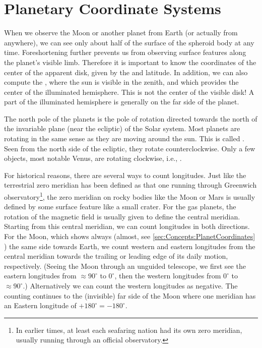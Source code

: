 \section{Planetary Coordinate Systems}
\label{sec:Nomenclature:CoordinateSystems}

When we observe the Moon or another planet from Earth (or actually
from anywhere), we can see only about half of the surface of the
spheroid body at any time. Foreshortening further prevents us from
observing surface features along the planet's visible limb. Therefore
it is important to know the coordinates of the center of the apparent
disk, given by the  and latitude. In
addition, we can also compute the , where
the sun is visible in the zenith, and which provides the center of the
illuminated hemisphere. This is not the center of the visible disk! A
part of the illuminated hemisphere is generally on the far side of the
planet.

The north pole of the planets is the pole of rotation directed towards
the north of the invariable plane (near the ecliptic) of the Solar
system. Most planets are rotating in the same sense as they are moving
around the sun. This is called
. Seen from the north side of
the ecliptic, they rotate counterclockwise. Only a few objects, most
notable Venus, are rotating clockwise, i.e.,
.

For historical reasons, there are several ways to count
longitudes. Just like the terrestrial zero meridian has been defined
as that one running through Greenwich observatory\footnote{In earlier
  times, at least each seafaring nation had its own zero meridian,
  usually running through an official observatory.}, the zero meridian
on rocky bodies like the Moon or Mars is usually defined by some
surface feature like a small crater. For the gas planets, the rotation
of the magnetic field is usually given to define the central
meridian. Starting from this central meridian, we can count longitudes
in both directions. For the Moon, which shows always (almost, see
\ref{sec:Concepts:PlanetCoordinates} ) the same side towards Earth, we
count western and eastern longitudes from the central meridian towards
the trailing or leading edge of its daily motion,
respectively. (Seeing the Moon through an unguided telescope, we first
see the eastern longitudes from $\approx 90^\circ$ to $0^\circ$, then
the western longitudes from $0^\circ$ to $\approx 90^\circ$.)
Alternatively we can count the western longitudes as negative. The
counting continues to the (invisible) far side of the Moon where one
meridian has an Eastern longitude of $+180^\circ=-180^\circ$.

